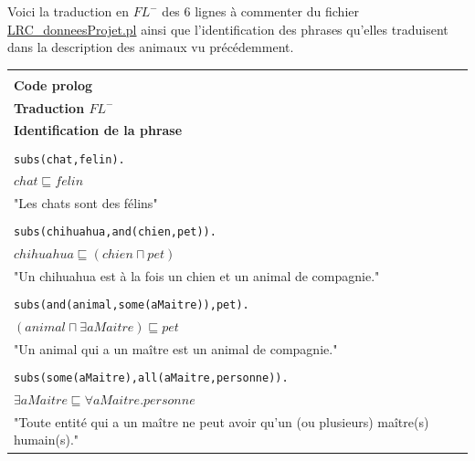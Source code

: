 \documentclass[a4paper,12pt]{report}
\begin{document}
\begin{tcolorbox}[colback=gray!10, colframe=blue!30, coltitle=black, title=Réponse à l'exercice 1 - 1/1]

    Voici la traduction en \(FL^-\) des 6 lignes à commenter du fichier \href{./src/LRC\_donneesProjet.pl}{LRC\_donneesProjet.pl} ainsi que l'identification
        des phrases qu'elles traduisent dans la description des animaux vu précédemment.

    \begin{table}[H]
        \centering
        \setlength{\tabcolsep}{10pt}
        \begin{tabularx}{\textwidth}{|Y|}

            \hline \\[-0.4cm]
            \textbf{Code prolog} \\[0.3cm]
            \textbf{Traduction \(FL^-\)} \\[0.3cm]
            \textbf{Identification de la phrase} \\[0.1cm]
            \hline

            \hline \\[-0.4cm]
            \texttt{subs(chat,felin).} \\[0.3cm]
            \(chat \sqsubseteq felin\) \\[0.3cm]
            "Les chats sont des félins" \\[0.1cm]
            \hline

            \hline \\[-0.4cm]
            \texttt{subs(chihuahua,and(chien,pet)).} \\[0.3cm]
            \(chihuahua \sqsubseteq (chien \sqcap pet) \) \\[0.3cm]
            "Un chihuahua est à la fois un chien et un animal de compagnie." \\[0.1cm]
            \hline

            \hline \\[-0.4cm]
            \texttt{subs(and(animal,some(aMaitre)),pet).} \\[0.3cm]
            \((animal \sqcap \exists aMaitre) \sqsubseteq pet\) \\[0.3cm]
            "Un animal qui a un maître est un animal de compagnie." \\[0.1cm]
            \hline

            \hline \\[-0.4cm]
            \texttt{subs(some(aMaitre),all(aMaitre,personne)).} \\[0.3cm]
            \(\exists aMaitre \sqsubseteq \forall aMaitre.personne\) \\[0.3cm]
            "Toute entité qui a un maître ne peut avoir qu'un (ou plusieurs) maître(s) humain(s)." \\[0.1cm]
            \hline


\end{tabularx}
\end{table}
\end{tcolorbox}
\end{document}
